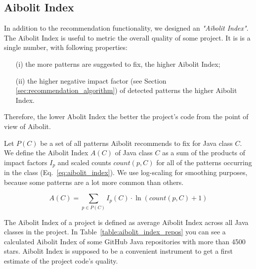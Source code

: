 \subsection{Aibolit Index}

In addition to the recommendation functionality, we designed an \textit{"Aibolit Index"}. 
The Aibolit Index is useful to metric the overall quality of some project.
It is is a single number, with following properties: 
\begin{itemize}
\item[(i)] the more patterns are suggested to fix, the higher Aibolit Index;
\item[(ii)] the higher negative impact factor (see Section \ref{sec:recommendation_algorithm}) 
of detected patterns the higher Aibolit Index.
\end{itemize}
Therefore, the lower Abolit Index the better the project's code from the point 
of view of Aibolit.

Let $P(C)$ be a set of all patterns Aibolit recommends to fix for Java class $C$.
We define the Aibolit Index $A(C)$ of Java class $C$ as a sum of the products of
impact factors $I_{p}$ and scaled counts $count(p, C)$ for all of the 
patterns occurring in the class (Eq.~\ref{eq:aibolit_index}). We use log-scaling for smoothing purposes, because some patterns are a lot more common than others.    


\begin{equation}
    A(C) = \sum_{p \in P(C)} { I_{p}(C) \cdot \ln{(count(p, C) + 1)} } \label{eq:aibolit_index}
\end{equation}


The Aibolit Index of a project is defined as average Aibolit Index
across all Java classes in the project. In Table~\ref{table:aibolit_index_repos} 
you can see a calculated Aibolit Index of some GitHub Java repositories with 
more than 4500 stars. Aibolit Index is supposed to be a convenient instrument
to get a first estimate of the project code's quality. 


